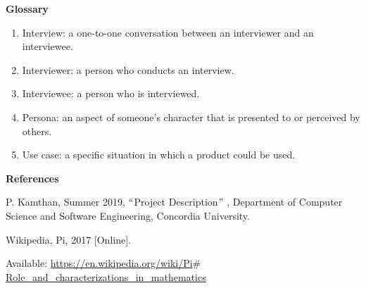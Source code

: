 \documentclass[12pt]{article}
\begin{document}
\vspace{\baselineskip}

\vspace{\baselineskip}

\vspace{\baselineskip}
\begin{justify}
{\fontsize{14pt}{16.8pt}\selectfont \textbf{Glossary}\par}
\end{justify}\par

\begin{enumerate}
	\item Interview: a one-to-one conversation between an interviewer and an interviewee.\par

	\item Interviewer: a person who conducts an interview.\par

	\item Interviewee: a person who is interviewed.\par

	\item Persona: an aspect of someone’s character that is presented to or perceived by others.\par

	\item Use case: a specific situation in which a product could be used.
\end{enumerate}\par


\vspace{\baselineskip}
\begin{justify}
{\fontsize{14pt}{16.8pt}\selectfont \textbf{References}\par}
\end{justify}\par

{\fontsize{10pt}{12.0pt}\selectfont [1]\textbf{ }P. Kamthan, Summer 2019, $``$Project Description$"$ , Department of Computer Science and Software Engineering, Concordia University.\par}\par

{\fontsize{10pt}{12.0pt}\selectfont [2] Wikipedia, Pi, 2017 [Online]. \par}\par

{\fontsize{10pt}{12.0pt}\selectfont Available: \href{https://en.wikipedia.org/wiki/Pi#Role_and_characterizations_in_mathematics}{https://en.wikipedia.org/wiki/Pi$\#$ Role\_and\_characterizations\_in\_mathematics}\par}\par
\end{document}
